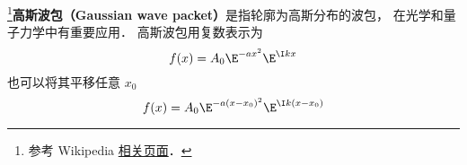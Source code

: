 
\begin{issues}
\issueDraft
\end{issues}


\footnote{参考 Wikipedia \href{https://en.wikipedia.org/wiki/Wave_packet}{相关页面}．}\textbf{高斯波包（Gaussian wave packet）}是指轮廓为高斯分布的波包， 在光学和量子力学中有重要应用． 高斯波包用复数表示为
\begin{equation}
f(x) = A_0 \E^{-a x^2}\E^{\I k x}
\end{equation}
也可以将其平移任意 $x_0$
\begin{equation}
f(x) = A_0 \E^{-a(x-x_0)^2}\E^{\I k (x-x_0)}
\end{equation}
